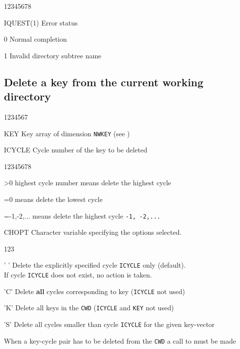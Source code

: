 \begin{DLtt}{12345678}
\item[IQUEST(1)]Error status
\begin{DLtt}{12}
\item[0]Normal completion
\item[1]Invalid directory subtree name
\end{DLtt}
\end{DLtt}

\subsection{Delete a key from the current working directory}
\begin{DLtt}{1234567}
\item[KEY]Key array of dimension {\tt NWKEY} (see )
\item[ICYCLE]Cycle number of the key to be deleted
\begin{DLtt}{12345678}
\item[>0] highest cycle number means delete the highest cycle
\item[=0] means delete the lowest cycle
\item[=-1,-2,...] means delete the highest cycle {\tt -1, -2,...}
\end{DLtt}
\item[CHOPT]Character variable specifying the options selected.
\begin{DLtt}{123}
\item[' ']Delete the explicitly specified cycle {\tt ICYCLE} only (default).\\
If cycle {\tt ICYCLE} does not exist, no action is taken.
\item['C']Delete {\bf all} cycles corresponding to key ({\tt ICYCLE} not used)
\item['K']Delete all keys in the {\tt CWD} ({\tt ICYCLE} and {\tt KEY} not used)
\item['S']Delete all cycles smaller than cycle {\tt ICYCLE} for the given
key-vector
\end{DLtt}
\end{DLtt}

When a key-cycle pair has to be deleted from the
{\tt CWD} a call to  must be made

